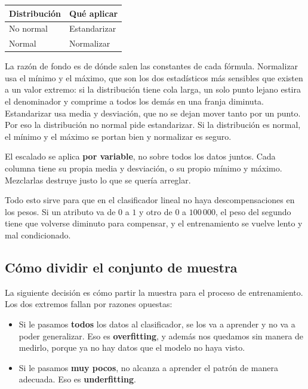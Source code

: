 \documentclass[11pt,letterpaper]{article}
\begin{document}
\begin{center}
\begin{tabular}{ll}
  \toprule
  \textbf{Distribución} & \textbf{Qué aplicar} \\
  \midrule
  No normal & Estandarizar \\
  Normal    & Normalizar \\
  \bottomrule
\end{tabular}
\end{center}

\begin{idea}
  La razón de fondo es de dónde salen las constantes de cada fórmula.
  Normalizar usa el mínimo y el máximo, que son los dos estadísticos
  más sensibles que existen a un valor extremo: si la distribución
  tiene cola larga, un solo punto lejano estira el denominador y
  comprime a todos los demás en una franja diminuta. Estandarizar usa
  media y desviación, que no se dejan mover tanto por un punto. Por
  eso la distribución no normal pide estandarizar. Si la distribución
  es normal, el mínimo y el máximo se portan bien y normalizar es
  seguro.
\end{idea}

\begin{ojo}
  El escalado se aplica \textbf{por variable}, no sobre todos los
  datos juntos. Cada columna tiene su propia media y desviación, o su
  propio mínimo y máximo. Mezclarlas destruye justo lo que se quería
  arreglar.
\end{ojo}

Todo esto sirve para que en el clasificador lineal no haya
descompensaciones en los pesos. Si un atributo va de $0$ a $1$ y otro
de $0$ a $100\,000$, el peso del segundo tiene que volverse diminuto
para compensar, y el entrenamiento se vuelve lento y mal condicionado.

\subsection*{Cómo dividir el conjunto de muestra}

La siguiente decisión es cómo partir la muestra para el proceso de
entrenamiento. Los dos extremos fallan por razones opuestas:

\begin{itemize}[itemsep=0.2em]
  \item Si le pasamos \textbf{todos} los datos al clasificador, se los
        va a aprender y no va a poder generalizar. Eso es
        \textbf{overfitting}, y además nos quedamos sin manera de
        medirlo, porque ya no hay datos que el modelo no haya visto.
  \item Si le pasamos \textbf{muy pocos}, no alcanza a aprender el
        patrón de manera adecuada. Eso es \textbf{underfitting}.
\end{itemize}
\end{document}
